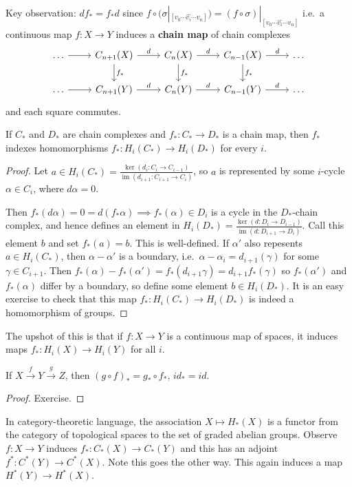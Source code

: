\documentclass{article}
\DeclareMathOperator{\im}{im}
\begin{document}
Key observation: $df_* = f_*d$ since $f \circ (\sigma|_{[v_0 \dotsm \hat{v_i} \dotsm v_n]}) = (f \circ \sigma)|_{[v_0 \dotsm \hat{v_i} \dotsm v_n]}$
i.e.\ a continuous map $f: X \to Y$ induces a \textbf{chain map} of chain complexes
\begin{equation*}
  \begin{tikzcd}
    \dots \rar & C_{n+1}(X) \rar{d} \dar{f_*} & C_n(X) \rar{d} \dar{f_*} & C_{n-1}(X) \rar{d} \dar{f_*} & \dots \\
    \dots \rar & C_{n+1}(Y) \rar{d}  & C_n(Y) \rar{d}  & C_{n-1}(Y) \rar{d}  & \dots
  \end{tikzcd}
\end{equation*}
and each square commutes.
\begin{lemma}
  If $C_*$ and $D_*$ are chain complexes and $f_*:C_* \to D_*$ is a chain map, then $f_*$ indexes homomorphisms $f_*:H_i(C_*) \to H_i(D_*)$ for every $i$.
\end{lemma}
\begin{proof}
  Let $a \in H_i(C_*) = \frac{\ker(d_i:C_i \to C_{i-1})}{\im(d_{i+1}:C_{i+1} \to C_i)}$, so $a$ is represented by some $i$-cycle $\alpha \in C_i$, where $d \alpha = 0$.

  Then $f_*(d\alpha) = 0 = d(f_* \alpha) \implies f_*(\alpha) \in D_i$ is a cycle in the $D_*$-chain complex, and hence defines an element in $H_i(D_*) = \frac{\ker(d:D_i \to D_{i-1})}{\im(d:D_{i+1}\to D_i)}$. Call this element $b$ and set $f_*(a) = b$.
  This is well-defined.
  If $\alpha'$ also repesents $a \in H_i(C_*)$, then $\alpha-\alpha'$ is a boundary, i.e.\ $\alpha-\alpha_i = d_{i+1}(\gamma)$ for some $\gamma \in C_{i+1}$.
  Then $f_*(\alpha) - f_*(\alpha') = f_*(d_{i+1}\gamma) = d_{i+1} f_*(\gamma)$ so $f_*(\alpha')$ and $f_*(\alpha)$ differ by a boundary, so define some element $b \in H_i(D_*)$.
  It is an easy exercise to check that this map $f_*:H_i(C_*) \to H_i(D_*)$ is indeed a homomorphism of groups.
\end{proof}
The upshot of this is that if $f:X\to Y$ is a continuous map of spaces, it induces maps $f_*:H_i(X) \to H_i(Y)$ for all $i$.
\begin{lemma}
  If $X \xrightarrow{f} Y \xrightarrow{g} Z$, then $(g \circ f)_* = g_* \circ f_*$, $id_* = id$.
\end{lemma}
\begin{proof}
  Exercise.
\end{proof}
In category-theoretic language, the association $X \mapsto H_*(X)$ is a functor from the category of topological spaces to the set of graded abelian groups.
Observe $f:X \to Y$ induces $f_*:C_*(X) \to C_*(Y)$ and this has an adjoint $f^*: C^*(Y) \to C^*(X)$.
Note this goes the other way. This again induces a map $H^*(Y) \to H^*(X)$.
\end{document}
